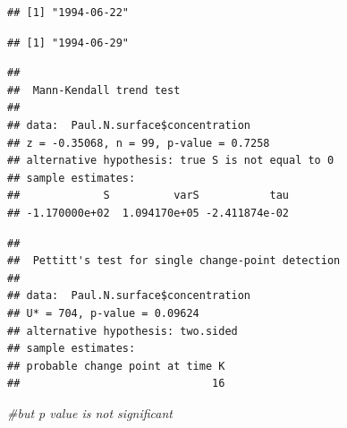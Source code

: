 \documentclass[]{article}
\newenvironment{Shaded}{\begin{snugshade}}{\end{snugshade}}
\newcommand{\KeywordTok}[1]{\textcolor[rgb]{0.13,0.29,0.53}{\textbf{#1}}}
\newcommand{\DecValTok}[1]{\textcolor[rgb]{0.00,0.00,0.81}{#1}}
\newcommand{\CommentTok}[1]{\textcolor[rgb]{0.56,0.35,0.01}{\textit{#1}}}
\newcommand{\OperatorTok}[1]{\textcolor[rgb]{0.81,0.36,0.00}{\textbf{#1}}}
\newcommand{\NormalTok}[1]{#1}
\begin{document}
\begin{verbatim}
## [1] "1994-06-22"
\end{verbatim}

\begin{Shaded}
\end{Shaded}

\begin{verbatim}
## [1] "1994-06-29"
\end{verbatim}

\begin{Shaded}
\end{Shaded}

\begin{verbatim}
## 
##  Mann-Kendall trend test
## 
## data:  Paul.N.surface$concentration
## z = -0.35068, n = 99, p-value = 0.7258
## alternative hypothesis: true S is not equal to 0
## sample estimates:
##             S          varS           tau 
## -1.170000e+02  1.094170e+05 -2.411874e-02
\end{verbatim}

\begin{Shaded}
\end{Shaded}

\begin{verbatim}
## 
##  Pettitt's test for single change-point detection
## 
## data:  Paul.N.surface$concentration
## U* = 704, p-value = 0.09624
## alternative hypothesis: two.sided
## sample estimates:
## probable change point at time K 
##                              16
\end{verbatim}

\begin{Shaded}
\begin{Highlighting}[]
\CommentTok{#but p value is not significant}
\end{Highlighting}
\end{Shaded}
\end{document}
